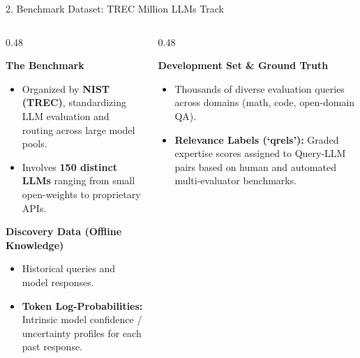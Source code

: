 \documentclass[aspectratio=169, 10pt]{beamer}
\begin{document}
\begin{frame}{2. Benchmark Dataset: TREC Million LLMs Track}
    \begin{columns}[T]
        \begin{column}{0.48\textwidth}
            \begin{block}{\textbf{The Benchmark}}
                \begin{itemize}
                    \item Organized by \textbf{NIST (TREC)}, standardizing LLM evaluation and routing across large model pools.
                    \item Involves \textbf{150 distinct LLMs} ranging from small open-weights to proprietary APIs.
                \end{itemize}
            \end{block}
            
            \vspace{0.2cm}
            \begin{block}{\textbf{Discovery Data (Offline Knowledge)}}
                \begin{itemize}
                    \item Historical queries and model responses.
                    \item \textbf{Token Log-Probabilities:} Intrinsic model confidence / uncertainty profiles for each past response.
                \end{itemize}
            \end{block}
        \end{column}

        \begin{column}{0.48\textwidth}
            \begin{alertblock}{\textbf{Development Set \& Ground Truth}}
                \begin{itemize}
                    \item Thousands of diverse evaluation queries across domains (math, code, open-domain QA).
                    \item \textbf{Relevance Labels (`qrels'):} Graded expertise scores assigned to Query-LLM pairs based on human and automated multi-evaluator benchmarks.
                \end{itemize}
            \end{alertblock}


\end{column}
\end{columns}
\end{frame}
\end{document}
